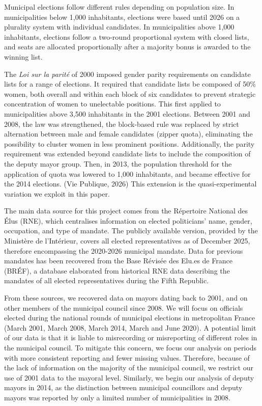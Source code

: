 \documentclass[11pt,a4paper]{article}
\makeatletter
\renewcommand{\section}{\@startsection{section}{1}{0pt}{1.4em}{0.6em}{\normalfont\bfseries}}
\makeatother
\begin{document}
Municipal elections follow different rules depending on population size. In municipalities below 1,000 inhabitants, elections were based until 2026 on a plurality system with individual candidates. In municipalities above 1,000 inhabitants, elections follow a two-round proportional system with closed lists, and seats are allocated proportionally after a majority bonus is awarded to the winning list.

The \textit{Loi sur la parité} of 2000 imposed gender parity requirements on candidate lists for a range of elections. It required that candidate lists be composed of 50\% women, both overall and within each block of six candidates to prevent strategic concentration of women to unelectable positions. This first applied to municipalities above 3,500 inhabitants in the 2001 elections. Between 2001 and 2008, the law was strengthened, the block-based rule was replaced by strict alternation between male and female candidates (zipper quota), eliminating the possibility to cluster women in less prominent positions. Additionally, the parity requirement was extended beyond candidate lists to include the composition of the deputy mayor group. Then, in 2013, the population threshold for the application of quota was lowered to 1,000 inhabitants, and became effective for the 2014 elections. (Vie Publique, 2026) This extension is the quasi-experimental variation we exploit in this paper.

\section{DATA SOURCES}

The main data source for this project comes from the Répertoire National des Élus (RNE), which centralises information on elected politicians' name, gender, occupation, and type of mandate. The publicly available version, provided by the Ministère de l'Intérieur, covers all elected representatives as of December 2025, therefore encompassing the 2020-2026 municipal mandate. Data for previous mandates has been recovered from the Base Révisée des Elu.es de France (BRÉF), a database elaborated from historical RNE data describing the mandates of all elected representatives during the Fifth Republic.

From these sources, we recovered data on mayors dating back to 2001, and on other members of the municipal council since 2008. We will focus on officials elected during the national rounds of municipal elections in metropolitan France (March 2001, March 2008, March 2014, March and June 2020). A potential limit of our data is that it is liable to misrecording or misreporting of different roles in the municipal council. To mitigate this concern, we focus our analysis on periods with more consistent reporting and fewer missing values. Therefore, because of the lack of information on the majority of the municipal council, we restrict our use of 2001 data to the mayoral level. Similarly, we begin our analysis of deputy mayors in 2014, as the distinction between municipal councillors and deputy mayors was reported by only a limited number of municipalities in 2008.
\end{document}
